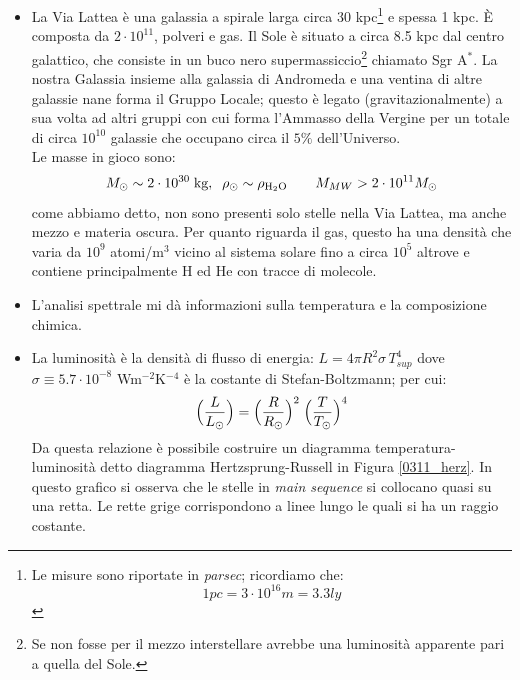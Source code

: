 \begin{itemize}
    \item La Via Lattea è una galassia a spirale larga circa 30 kpc\footnote{Le misure sono riportate in \textit{parsec}; ricordiamo che:
    $$1 \unit{pc} = 3\cdot 10^{16} \unit{m} = 3.3 \unit{ly}$$%
    } e spessa 1 kpc. \`E composta da $2\cdot 10^{11}$, polveri e gas. Il Sole è situato a circa 8.5 kpc dal centro galattico, che consiste in un buco nero supermassiccio\footnote{Se non fosse per il mezzo interstellare avrebbe una luminosità apparente pari a quella del Sole.} chiamato Sgr A$^*$. La nostra Galassia insieme alla galassia di Andromeda e una ventina di altre galassie nane forma il Gruppo Locale; questo è legato (gravitazionalmente) a sua volta ad altri gruppi con cui forma l'Ammasso della Vergine per un totale di circa $10^{10}$ galassie che occupano circa il $5\%$ dell'Universo.\\
    Le masse in gioco sono:
    $$M\sol\sim 2\cdot10^{30} \unit{kg}, \;\; \rho\sol \sim \rho_{\ce{H_2O}} \qquad M_{MW} > 2\cdot 10^{11} M\sol$$
    come abbiamo detto, non sono presenti solo stelle nella Via Lattea, ma anche mezzo e materia oscura. Per quanto riguarda il gas, questo ha una densità che varia da $10^9$ atomi/m$^3$ vicino al sistema solare fino a circa $10^5$ altrove e contiene principalmente H ed He con tracce di molecole.
    \item L'analisi spettrale mi dà informazioni sulla temperatura e la composizione chimica.
    \item La luminosità è la densità di flusso di energia: $L = 4\pi R^2 \sigma\, T_{sup}^4$ dove $\sigma \equiv 5.7\cdot10^{-8}$ Wm$^{-2}$K$^{-4}$ è  la costante di Stefan-Boltzmann; per cui:
    $$\Bigl ( \frac{L}{L_{\odot}} \Bigr ) = \Bigl ( \frac{R}{R_{\odot}}\Bigr )^2 \; \Bigl (\frac{T}{T_{\odot}} \Bigr )^4$$
    Da questa relazione è possibile costruire un diagramma temperatura-luminosità detto diagramma Hertzsprung-Russell in Figura \ref{0311_herz}. In questo grafico si osserva che le stelle in \textit{main sequence} si collocano quasi su una retta. Le rette grige corrispondono a linee lungo le quali si ha un raggio costante.
    \begin{figure}[h]

\end{figure}
\end{itemize}
